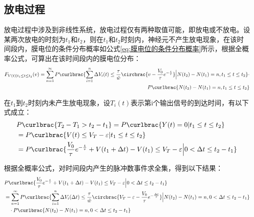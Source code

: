 \documentclass[11pt]{article}
\begin{document}
\subsection{放电过程}
放电过程中涉及到非线性系统，放电过程仅有两种取值可能，即放电或不放电。设某两次放电的时刻为$t_1$和$t_2$，则在$t_1$和$t_2$时刻内，神经元不产生放电现象，在该时间段内，膜电位的条件分布概率如公式\ref{eq:膜电位的条件分布概率}所示，根据全概率公式，可算出在该时间段内的膜电位分布：
\begin{align}
  \begin{aligned}
    F_{V(t)|t_1\le t\le t_2}(v)=    \sum_{n=1}^{\infty}P\curlbrac{\sum_{i=1}^{n}\Delta V_i(t)\le \frac{\tau}{\tilde{w}}\circbrac{v-\frac{V_0}{\tau}e^{-\frac{t}{\tau}}}\Big| N(t_2)-N(t_1)=n,t_1\le t\le t_2}\cdot \\
    P\curlbrac{ N(t_2)-N(t_1)=n,t_1\le t\le t_2}
  \end{aligned}
\end{align}\par
在$t_1$到$t_2$时刻内未产生放电现象，设$T_i(t)$表示第i个输出信号的到达时间，有以下式成立：
\begin{align*}
   & P\curlbrac{T_2-T_{1}>t_2-t_1}=P\curlbrac{Y(t)=0|t_1\le t\le t_2}                                                      \\
   & =  P\curlbrac{V(t)\le V_T-\varepsilon|t_1\le t\le t_2}                                                                \\
   & = P\curlbrac{\frac{V_0}{\tau}e^{-\frac{t}{\tau}}+V(t_1+\Delta t)-V(t_1)\le V_T-\varepsilon\Big|0<\Delta t\le t_2-t_1}
\end{align*}\par
根据全概率公式，对时间段内产生的脉冲数事件求全集，得到以下结果：
\begin{align}
  \begin{aligned}
     & P\curlbrac{\frac{V_0}{\tau}e^{-\frac{t}{\tau}}+V(t_1+\Delta t)-V(t_1)\le V_T-\varepsilon\Big|0<\Delta t\le t_2-t_1} \\&=\sum_{n=1}^{\infty}P\curlbrac{\sum_{i=1}^{n}\Delta V_i(\Delta t)\le \frac{\tau}{\tilde{w}}\circbrac{V_T-\varepsilon-\frac{V_0}{\tau}e^{-\frac{\Delta t}{\tau}}}\Big| N(t_2)-N(t_1)=n,0<\Delta t\le t_2-t_1}\\
     & \quad\cdot  P\curlbrac{ N(t_2)-N(t_1)=n,0<\Delta t\le t_2-t_1}                                                      \\
  \end{aligned}
\end{align}\par

\newpage
\printbibliography[heading=bibliography,title=参考文献]
\end{document}
